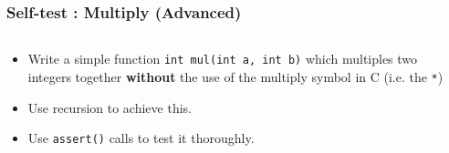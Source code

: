 
\begin{frame}[fragile]
\frametitle{Self-test : Multiply (Advanced)}
\begin{columns}

\begin{column}{0.5\textwidth}
\begin{itemize}[<+->]
\item Write a simple function \verb^int mul(int a, int b)^ which
multiples two integers together {\bf without} the use of the
multiply symbol in C (i.e. the \verb^*^)
\item Use recursion to achieve this.
\item Use \verb^assert()^ calls to test it thoroughly.
\end{itemize}
\end{column}

\begin{column}{0.35\textwidth}

\end{column}

\end{columns}
\end{frame}

